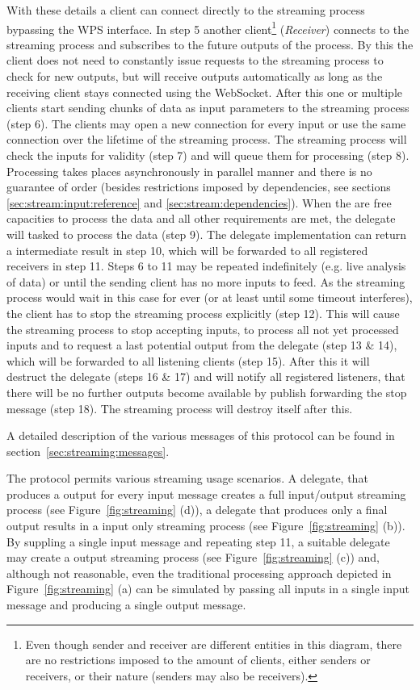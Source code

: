 		With these details a client can connect directly to the streaming process bypassing the \ac{WPS} interface. In step 5 another client\footnote{Even though sender and receiver are different entities in this diagram, there are no restrictions imposed to the amount of clients, either senders or receivers, or their nature (senders may also be receivers).} (\emph{Receiver}) connects to the streaming process and subscribes to the future outputs of the process. By this the client does not need to constantly issue requests to the streaming process to check for new outputs, but will receive outputs automatically as long as the receiving client stays connected using the WebSocket.
		After this one or multiple clients start sending chunks of data as input parameters to the streaming process (step 6). The clients may open a new connection for every input or use the same connection over the lifetime of the streaming process. The streaming process will check the inputs for validity (step 7) and will queue them for processing (step 8).
		Processing takes places asynchronously in parallel manner and there is no guarantee of order (besides restrictions imposed by dependencies, see sections \ref{sec:stream:input:reference} and \ref{sec:stream:dependencies}). When the are free capacities to process the data and all other requirements are met, the delegate will tasked to process the data (step 9). The delegate implementation can return a intermediate result in step 10, which will be forwarded to all registered receivers in step 11.
		Steps 6 to 11 may be repeated indefinitely (e.g. live analysis of data) or until the sending client has no more inputs to feed. As the streaming process would wait in this case for ever (or at least until some timeout interferes), the client has to stop the streaming process explicitly (step 12).
		This will cause the streaming process to stop accepting inputs, to process all not yet processed inputs and to request a last potential output from the delegate (step 13 \& 14), which will be forwarded to all listening clients (step 15). After this it will destruct the delegate (steps 16 \& 17) and will notify all registered listeners, that there will be no further outputs become available by publish forwarding the stop message (step 18). The streaming process will destroy itself after this.

		A detailed description of the various messages of this protocol can be found in section~\ref{sec:streaming:messages}.

		The protocol permits various streaming usage scenarios. A delegate, that produces a output for every input message creates a full input/output streaming process (see Figure~\ref{fig:streaming} (d)), a delegate that produces only a final output results in a input only streaming process (see Figure~\ref{fig:streaming} (b)). By suppling a single input message and repeating step 11, a suitable delegate may create a output streaming process (see Figure~\ref{fig:streaming} (c)) and, although not reasonable, even the traditional processing approach depicted in Figure~\ref{fig:streaming} (a) can be simulated by passing all inputs in a single input message and producing a single output message.

